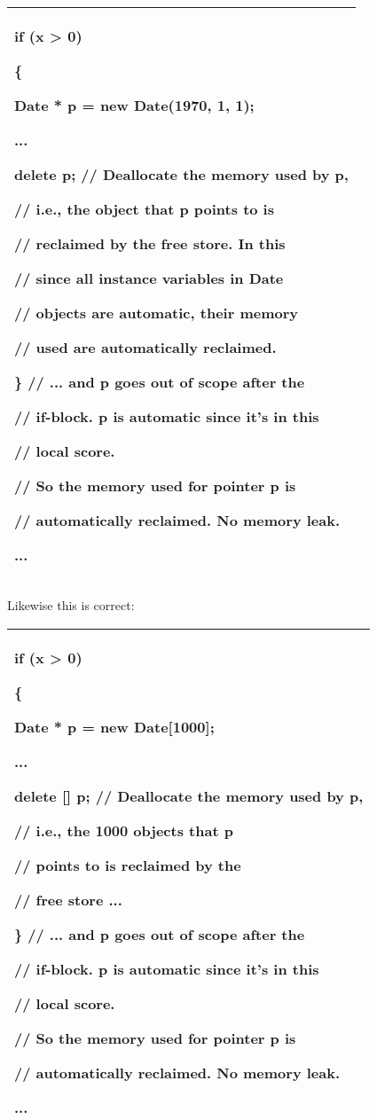 \documentclass[
]{article}
\begin{document}
\begin{longtable}[]{@{}l@{}}
\toprule
\endhead
\begin{minipage}[t]{0.97\columnwidth}\raggedright
if (x \textgreater{} 0)

\{

Date * p = new Date(1970, 1, 1);

...

delete p; // Deallocate the memory used by p,

// i.e., the object that p points to is

// reclaimed by the free store. In this

// since all instance variables in Date

// objects are automatic, their memory

// used are automatically reclaimed.

\} // ... and p goes out of scope after the

// if-block. p is automatic since it's in this

// local score.

// So the memory used for pointer p is

// automatically reclaimed. No memory leak.

...\strut
\end{minipage}\tabularnewline
\bottomrule
\end{longtable}

Likewise this is correct:

\begin{longtable}[]{@{}l@{}}
\toprule
\endhead
\begin{minipage}[t]{0.97\columnwidth}\raggedright
if (x \textgreater{} 0)

\{

Date * p = new Date{[}1000{]};

...

delete {[}{]} p; // Deallocate the memory used by p,

// i.e., the 1000 objects that p

// points to is reclaimed by the

// free store ...

\} // ... and p goes out of scope after the

// if-block. p is automatic since it's in this

// local score.

// So the memory used for pointer p is

// automatically reclaimed. No memory leak.

...\strut
\end{minipage}\tabularnewline
\bottomrule
\end{longtable}
\end{document}
